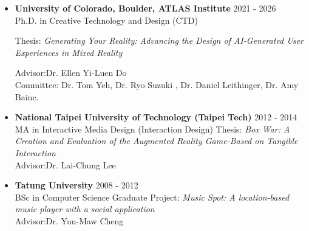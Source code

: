\begin{itemize}
    \item \textbf{University of Colorado, Boulder, ATLAS Institute} \hfill 2021 - 2026 \\
    Ph.D. in Creative Technology and Design (CTD) \newline
    
    Thesis: \textit{Generating Your Reality: Advancing the Design of AI-Generated User Experiences in Mixed Reality} 
    
    Advisor:Dr. Ellen Yi-Luen Do\\
    Committee: Dr. Tom Yeh, Dr. Ryo Suzuki , Dr. Daniel Leithinger, Dr. Amy Bainc.   
    
    
    \item \textbf{National Taipei University of Technology (Taipei Tech)} \hfill 2012 - 2014 \\
    MA in Interactive Media Design (Interaction Design) \newline
    Thesis: \textit{Box War: A Creation and Evaluation of the Augmented Reality Game-Based on Tangible Interaction}\\
    Advisor:Dr. Lai-Chung Lee
    
    \item \textbf{Tatung University} \hfill 2008 - 2012 \\
    BSc in Computer Science \newline
    Graduate Project: \textit{Music Spot: A location-based music player with a social application}\\ 
    Advisor:Dr. Yun-Maw Cheng

\end{itemize}